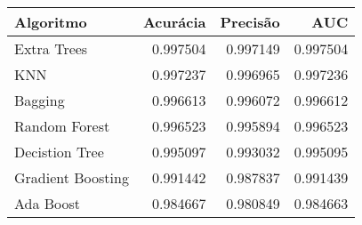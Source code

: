 \begin{tabular}{lrrr}
\toprule
        Algoritmo &  Acurácia &  Precisão &      AUC \\
\midrule
      Extra Trees &  0.997504 &  0.997149 & 0.997504 \\
              KNN &  0.997237 &  0.996965 & 0.997236 \\
          Bagging &  0.996613 &  0.996072 & 0.996612 \\
    Random Forest &  0.996523 &  0.995894 & 0.996523 \\
   Decistion Tree &  0.995097 &  0.993032 & 0.995095 \\
Gradient Boosting &  0.991442 &  0.987837 & 0.991439 \\
        Ada Boost &  0.984667 &  0.980849 & 0.984663 \\
\bottomrule
\end{tabular}
